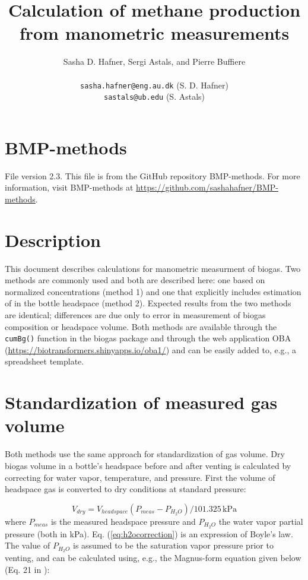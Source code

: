 \documentclass[]{article}
\title {Calculation of methane production from manometric measurements}
\author{Sasha D. Hafner, Sergi Astals, and Pierre Buffiere\\
\\
\texttt{sasha.hafner@eng.au.dk} (S. D. Hafner)\\
\texttt{sastals@ub.edu} (S. Astals)\\
}
\newcommand{\unit}[1]{\ensuremath{\, \mathrm{#1}}}
\begin{document}
\maketitle

\section{BMP-methods}
File version 2.3. 
This file is from the GitHub repository BMP-methods.
For more information, visit BMP-methods at \url{https://github.com/sashahafner/BMP-methods}.

\section{Description}
This document describes calculations for manometric measurment of biogas.
Two methods are commonly used and both are described here: one based on normalized  concentrations (method 1) and one that explicitly includes estimation of  in the bottle headspace (method 2).
Expected results from the two methods are identical; differences are due only to error in measurement of biogas composition or headspace volume.
Both methods are available through the \texttt{cumBg()} function in the biogas package \cite{softwarex} and through the web application OBA (\url{https://biotransformers.shinyapps.io/oba1/}) and can be easily added to, e.g., a spreadsheet template.

\section{Standardization of measured gas volume}
Both methods use the same approach for standardization of gas volume.
Dry biogas volume in a bottle's headspace before and after venting is calculated by correcting for water vapor, temperature, and pressure.
First the volume of headspace gas is converted to dry conditions at standard pressure:

\begin{equation}
  \label{eq:h2ocorrection}
  V_{dry} = V_{headspace}(P_{meas} - P_{H_2O})/101.325 \unit{kPa}
\end{equation}
where $P_{meas}$ is the measured headspace pressure and $P_{H_2O}$ the water vapor partial pressure (both in kPa).
Eq. (\ref{eq:h2ocorrection}) is an expression of Boyle's law.
The value of $P_{H_2O}$ is assumed to be the saturation vapor pressure prior to venting, and can be calculated using, e.g., the Magnus-form equation given below (Eq. 21 in \cite{magnus}):
\end{document}
